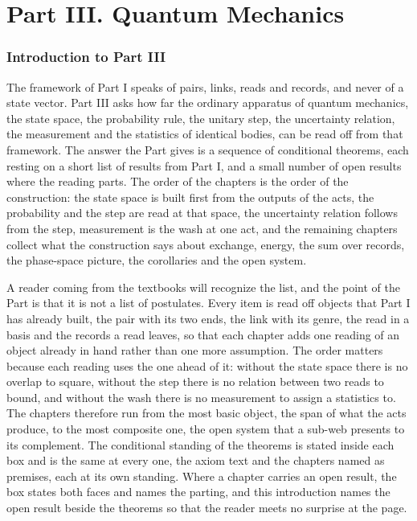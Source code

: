 \clearpage
\part*{Part III. Quantum Mechanics}
\label{atlaspart:03-quantum-mechanics}
\section*{Introduction to Part III}\label{narr:part:II}
The framework of Part I speaks of pairs, links, reads and records, and never of a state vector. Part III asks how far the ordinary apparatus of quantum mechanics, the state space, the probability rule, the unitary step, the uncertainty relation, the measurement and the statistics of identical bodies, can be read off from that framework. The answer the Part gives is a sequence of conditional theorems, each resting on a short list of results from Part I, and a small number of open results where the reading parts. The order of the chapters is the order of the construction: the state space is built first from the outputs of the acts, the probability and the step are read at that space, the uncertainty relation follows from the step, measurement is the wash at one act, and the remaining chapters collect what the construction says about exchange, energy, the sum over records, the phase-space picture, the corollaries and the open system.

A reader coming from the textbooks will recognize the list, and the point of the Part is that it is not a list of postulates. Every item is read off objects that Part I has already built, the pair with its two ends, the link with its genre, the read in a basis and the records a read leaves, so that each chapter adds one reading of an object already in hand rather than one more assumption. The order matters because each reading uses the one ahead of it: without the state space there is no overlap to square, without the step there is no relation between two reads to bound, and without the wash there is no measurement to assign a statistics to. The chapters therefore run from the most basic object, the span of what the acts produce, to the most composite one, the open system that a sub-web presents to its complement. The conditional standing of the theorems is stated inside each box and is the same at every one, the axiom text and the chapters named as premises, each at its own standing. Where a chapter carries an open result, the box states both faces and names the parting, and this introduction names the open result beside the theorems so that the reader meets no surprise at the page.

